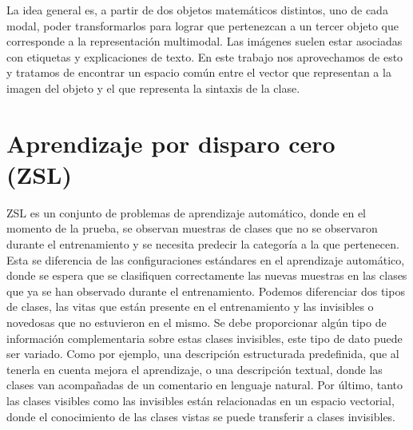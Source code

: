 La idea general es, a partir de dos objetos matemáticos distintos, uno de cada modal, poder transformarlos para lograr que pertenezcan a un tercer objeto que corresponde a la representación multimodal. Las imágenes suelen estar asociadas con etiquetas y explicaciones de texto. En este trabajo nos aprovechamos de esto y tratamos de encontrar un espacio común entre el vector que representan a la imagen del objeto y el que representa la sintaxis de la clase.

\section {Aprendizaje por disparo cero (ZSL)} \label{sec:aprendizajepordisparocero}
ZSL es un conjunto de problemas de aprendizaje automático, donde en el momento de la prueba, se observan muestras de clases que no se observaron durante el entrenamiento y se necesita predecir la categoría a la que pertenecen. Esta se diferencia de las configuraciones estándares en el aprendizaje automático, donde se espera que se clasifiquen correctamente las nuevas muestras en las clases que ya se han observado durante el entrenamiento.
Podemos diferenciar dos tipos de clases, las vitas que están presente en el entrenamiento y las invisibles o novedosas que no estuvieron en el mismo. Se debe proporcionar algún tipo de información complementaria sobre estas clases invisibles, este tipo de dato puede ser variado. Como por ejemplo, una descripción estructurada predefinida, que al tenerla en cuenta mejora el aprendizaje, o una descripción textual, donde las clases van acompañadas de un comentario en lenguaje natural. Por último, tanto las clases visibles como las invisibles están relacionadas en un espacio vectorial, donde el conocimiento de las clases vistas se puede transferir a clases invisibles.\\

